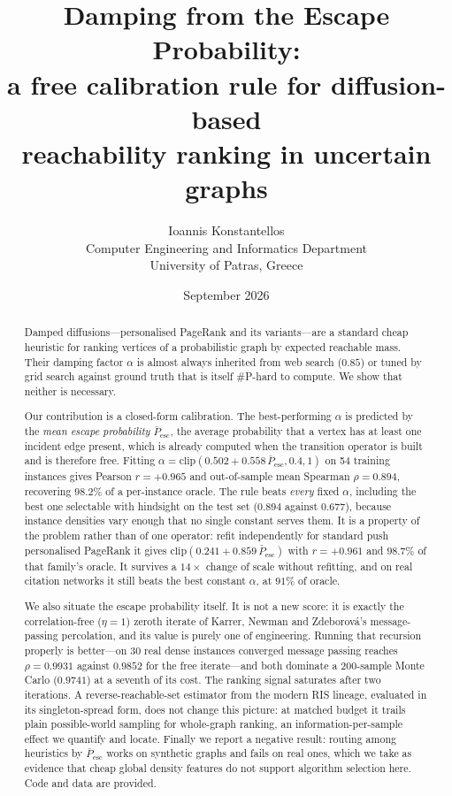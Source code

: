 \documentclass[11pt,a4paper]{article}
\title{\bf Damping from the Escape Probability:\\
a free calibration rule for diffusion-based\\
reachability ranking in uncertain graphs}
\author{Ioannis Konstantellos\\
\small Computer Engineering and Informatics Department\\
\small University of Patras, Greece}
\date{September 2026}
\newcommand{\Pescbar}{\bar{P}_{\mathrm{esc}}}
\newcommand{\clip}{\mathrm{clip}}
\begin{document}
\maketitle

\begin{abstract}
Damped diffusions---personalised PageRank and its variants---are a standard
cheap heuristic for ranking vertices of a probabilistic graph by expected
reachable mass. Their damping factor $\alpha$ is almost always inherited from
web search ($0.85$) or tuned by grid search against ground truth that is itself
\#P-hard to compute. We show that neither is necessary.

Our contribution is a closed-form calibration. The best-performing $\alpha$ is
predicted by the \emph{mean escape probability} $\Pescbar$, the average
probability that a vertex has at least one incident edge present, which is
already computed when the transition operator is built and is therefore free.
Fitting $\alpha=\clip(0.502+0.558\,\Pescbar,0.4,1)$ on 54 training instances
gives Pearson $r=+0.965$ and out-of-sample mean Spearman $\rho=0.894$,
recovering $98.2\%$ of a per-instance oracle. The rule beats \emph{every} fixed
$\alpha$, including the best one selectable with hindsight on the test set
($0.894$ against $0.677$), because instance densities vary enough that no single
constant serves them. It is a property of the problem rather than of one
operator: refit independently for standard push personalised PageRank it gives
$\clip(0.241+0.859\,\Pescbar)$ with $r=+0.961$ and $98.7\%$ of that family's
oracle. It survives a $14\times$ change of scale without refitting, and on real
citation networks it still beats the best constant $\alpha$, at $91\%$ of oracle.

We also situate the escape probability itself. It is not a new score: it is
exactly the correlation-free ($\eta=1$) zeroth iterate of Karrer, Newman and
Zdeborov\'a's message-passing percolation, and its value is purely one of
engineering. Running that recursion properly is better---on 30 real dense
instances converged message passing reaches $\rho=0.9931$ against $0.9852$ for
the free iterate---and both dominate a 200-sample Monte Carlo ($0.9741$) at a
seventh of its cost. The ranking signal saturates after two iterations. A
reverse-reachable-set estimator from the modern RIS lineage, evaluated in its
singleton-spread form, does not change this picture: at matched budget it
trails plain possible-world sampling for whole-graph ranking, an
information-per-sample effect we quantify and locate. Finally
we report a negative result: routing among heuristics by $\Pescbar$ works on
synthetic graphs and fails on real ones, which we take as evidence that cheap
global density features do not support algorithm selection here. Code and data
are provided.
\end{abstract}
\end{document}

